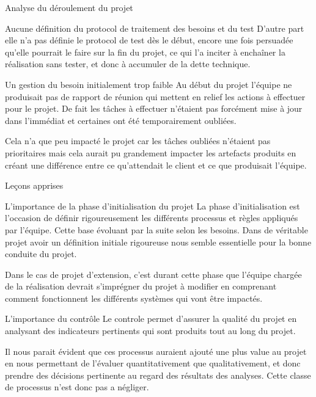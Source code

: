 \documentclass[]{article}
\begin{document}
{\begin{section}{Analyse du déroulement du projet}
\begin{subsection}{Aucune définition du protocol de traitement des besoins et du test}
     D'autre part elle n'a pas définie le protocol de test dès le début, encore une fois persuadée qu'elle pourrait le faire sur la fin du projet, ce qui l'a inciter à enchaîner la réalisation sans tester, et donc à accumuler de la dette technique.
 \end{subsection}

 \begin{subsection}{Un gestion du besoin initialement trop faible}
     Au début du projet l'équipe ne produisait pas de rapport de réunion qui mettent en relief les actions à effectuer pour le projet. De fait les tâches à effectuer n'étaient pas forcément mise à jour dans l'immédiat et certaines ont été temporairement oubliées.

     Cela n'a que peu impacté le projet car les tâches oubliées n'étaient pas prioritaires mais cela aurait pu grandement impacter les artefacts produits en créant une différence entre ce qu'attendait le client et ce que produisait l'équipe.
 \end{subsection}
\end{section}

\begin{section}{Leçons apprises}
 \begin{subsection}{L'importance de la phase d'initialisation du projet}
    La phase d'initialisation est l'occasion de définir rigoureusement les différents processus et règles appliqués par l'équipe. Cette base évoluant par la suite selon les besoins. Dans de véritable projet avoir un définition initiale rigoureuse nous semble essentielle pour la bonne conduite du projet.

    Dans le cas de projet d'extension, c'est durant cette phase que l'équipe chargée de la réalisation devrait s'imprégner du projet à modifier en comprenant comment fonctionnent les différents systèmes qui vont être impactés.
 \end{subsection}

 \begin{subsection}{L'importance du contrôle}
    Le controle permet d'assurer la qualité du projet en analysant des indicateurs pertinents qui sont produits tout au long du projet.
    
    Il nous parait évident que ces processus auraient ajouté une plus value au projet en nous permettant de l'évaluer quantitativement que qualitativement, et donc prendre des décisions pertinente au regard des résultats des analyses. Cette classe de processus n'est donc pas a négliger.
 \end{subsection}


\end{section}}
\end{document}
